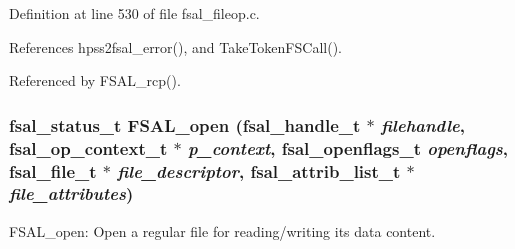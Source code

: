 Definition at line 530 of file fsal\_\-fileop.c.

References hpss2fsal\_\-error(), and Take\-Token\-FSCall().

Referenced by FSAL\_\-rcp().
\subsubsection{\setlength{\rightskip}{0pt plus 5cm}fsal\_\-status\_\-t FSAL\_\-open (fsal\_\-handle\_\-t $\ast$ {\em filehandle}, fsal\_\-op\_\-context\_\-t $\ast$ {\em p\_\-context}, fsal\_\-openflags\_\-t {\em openflags}, fsal\_\-file\_\-t $\ast$ {\em file\_\-descriptor}, fsal\_\-attrib\_\-list\_\-t $\ast$ {\em file\_\-attributes})}\label{fsal__fileop_8c_a1}


FSAL\_\-open: Open a regular file for reading/writing its data content.

